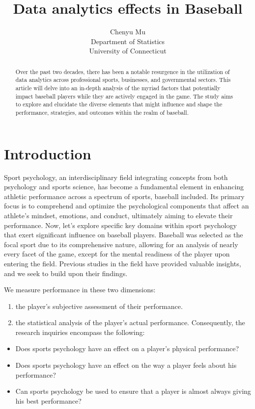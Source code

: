 \documentclass[12pt]{article}
\title{Data analytics effects in Baseball}
\author{Chenyu Mu\\
  Department of Statistics\\
  University of Connecticut
}
\begin{document}
\maketitle

\begin{abstract}
  Over the past two decades, there has been a notable resurgence in the utilization of data analytics across professional sports, businesses, and governmental sectors.
  This article will delve into an in-depth analysis of the myriad factors that potentially impact baseball players while they are actively engaged in the game. 
  The study aims to explore and elucidate the diverse elements that might influence and shape the performance, strategies, and outcomes within the realm of baseball. 
  \end{abstract}


\section{Introduction}
\label{sec:intro}
Sport psychology, an interdisciplinary field integrating concepts from both psychology and sports science, has become a fundamental element in enhancing athletic performance across a spectrum of sports, baseball included.
Its primary focus is to comprehend and optimize the psychological components that affect an athlete's mindset, emotions, and conduct, ultimately aiming to elevate their performance.
Now, let's explore specific key domains within sport psychology that exert significant influence on baseball players.
Baseball was selected as the focal sport due to its comprehensive nature, allowing for an analysis of nearly every facet of the game, except for the mental readiness of the player upon entering the field. 
Previous studies in the field \cite*{Dalmass2018baseball} have provided valuable insights, and we seek to build upon their findings. 

We measure performance in these two dimensions: 
\begin{enumerate}
\item the player's subjective assessment of their performance. 
\item the statistical analysis of the player's actual performance. Consequently, the research inquiries encompass the following:
\end{enumerate}
\begin{itemize}
  \item Does sports psychology have an effect on a player's physical performance?
  \item Does sports psychology have an effect on the way a player feels about his performance?
  \item Can sports psychology be used to ensure that a player is almost always giving his best performance?
\end{itemize}
\end{document}
